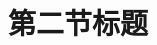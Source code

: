 \documentclass[../../main.tex]{subfiles}
\begin{document}
\section{第二节标题}

\lipsum[1-3]%
\end{document}
